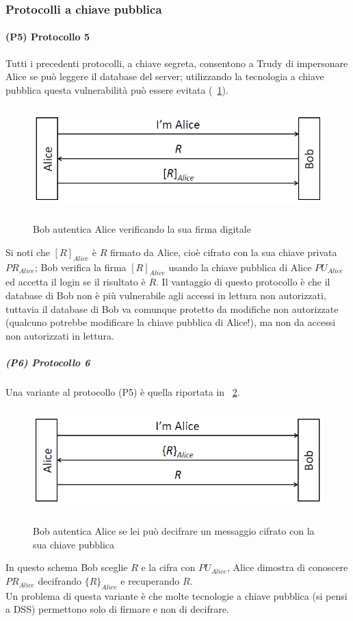 \subsubsection{Protocolli a chiave pubblica}
\paragraph{(P5) Protocollo 5}
Tutti i precedenti protocolli, a chiave segreta, consentono a Trudy di impersonare Alice se può leggere il database del server; utilizzando la tecnologia a chiave pubblica questa vulnerabilità può essere evitata (\figurename~\ref{fig:ImgS26bis}).
\begin{figure}[htbp]
	\centering%
	\subfigure%
	{\includegraphics[height=4cm, width=12cm, keepaspectratio]{Immagini/autenticazione/ImgS26bis.png}}
	\caption{Bob autentica Alice verificando la sua firma digitale}\label{fig:ImgS26bis} 	
\end{figure}
Si noti che $[R]_{Alice}$ è $R$ firmato da Alice, cioè cifrato con la sua chiave privata $PR_{Alice}$; Bob verifica la firma $[R]_{Alice}$ usando la chiave pubblica di Alice $PU_{Alice}$ ed accetta il login se il risultato è $R$. Il vantaggio di questo protocollo è che il database di Bob non è più vulnerabile agli accessi in lettura non
autorizzati, tuttavia il database di Bob va comunque protetto da modifiche non autorizzate (qualcuno potrebbe modificare la chiave pubblica di Alice!), ma non da accessi non autorizzati in lettura.

\subparagraph{(P6) Protocollo 6}
Una variante al protocollo (P5) è quella riportata in \figurename~\ref{fig:ImgS28bis}.

\begin{figure}[htbp]
	\centering%
	\subfigure%
	{\includegraphics[height=4cm, width=12cm, keepaspectratio]{Immagini/autenticazione/ImgS28bis.png}}
	\caption{Bob autentica Alice se lei può decifrare un messaggio cifrato con la sua chiave pubblica}\label{fig:ImgS28bis} 	
\end{figure}
In questo schema Bob sceglie $R$ e la cifra con $PU_{Alice}$, Alice dimostra di conoscere $PR_{Alice}$ decifrando $\lbrace R\rbrace_{Alice}$ e recuperando $R$.\\
Un problema di questa variante è che molte tecnologie a chiave pubblica (si pensi a DSS) permettono solo di firmare
e non di decifrare.

